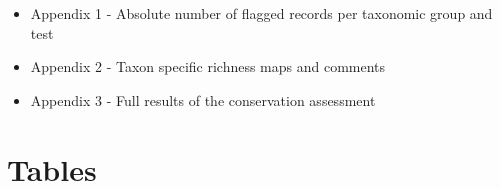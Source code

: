 \documentclass[fleqn,10pt,lineno]{wlpeerj} %
\begin{document}
\begin{itemize}
\item
  Appendix 1 - Absolute number of flagged records per taxonomic group and test
\item
  Appendix 2 - Taxon specific richness maps and comments
\item
  Appendix 3 - Full results of the conservation assessment
\end{itemize}

\hypertarget{tables}{%
\section*{Tables}\label{tables}}

\begin{table}


\end{table}
\end{document}
